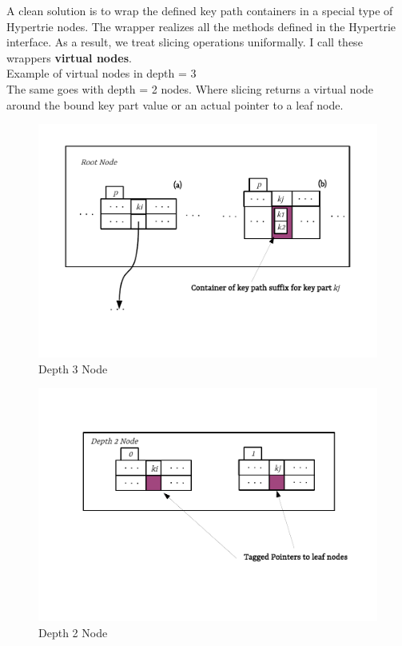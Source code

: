 A clean solution is to wrap the defined key path containers in a special type of Hypertrie nodes. The wrapper realizes all the methods defined in the Hypertrie interface. As a result, we treat slicing operations uniformally. I call these wrappers \textbf{virtual nodes}. \\

Example of virtual nodes in depth = 3 \\

The same goes with depth = 2 nodes. Where slicing returns a virtual node around the bound key part value or an actual pointer to a leaf node. \\


\begin{figure}
	\centering
	\vspace{-0.3in}
	\includegraphics{figures/chapter4/depth3}
	\caption{Depth 3 Node}
	\label{fig:compressed_depth_3_node}
\end{figure}



\begin{figure}
	\centering
	\vspace{-1in}
	\includegraphics{figures/chapter4/depth2}
	\caption{Depth 2 Node}
	\label{fig:compressed_depth_2_node}
\end{figure}


